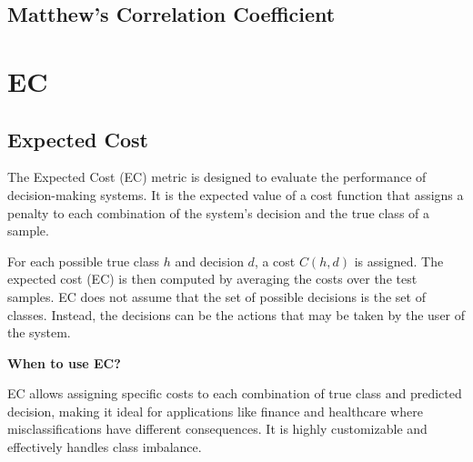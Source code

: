 \subsection{Matthew's Correlation Coefficient}


\clearpage
\thispagestyle{classificationstyle}
\section{EC}
\subsection{Expected Cost}

The Expected Cost (EC) metric is designed to evaluate the performance of decision-making systems. It is the expected value of a cost function that assigns a penalty to each combination of the system's decision and the true class of a sample. 

\begin{center}
\end{center}

For each possible true class $h$ and decision $d$, a cost $C(h, d)$ is assigned. The expected cost (EC) is then computed by averaging the costs over the test samples. EC does not assume that the set of possible decisions is the set of classes. Instead, the decisions can be the actions that may be taken by the user of the system.


\textbf{When to use EC?}

EC allows assigning specific costs to each combination of true class and predicted decision, making it ideal for applications like finance and healthcare where misclassifications have different consequences. It is highly customizable and effectively handles class imbalance.


